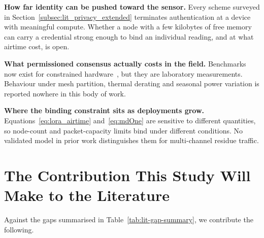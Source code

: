 \documentclass[12pt,a4paper,oneside]{book}
\begin{document}
\textbf{How far identity can be pushed toward the sensor.} Every scheme
surveyed in Section~\ref{subsec:lit_privacy_extended} terminates authentication
at a device with meaningful compute. Whether a node with a few kilobytes of
free memory can carry a credential strong enough to bind an individual reading,
and at what airtime cost, is open.

\textbf{What permissioned consensus actually costs in the
field.} Benchmarks now exist for constrained
hardware~\cite{zulkarnain2025performancebenchmarking, pebriyanti2025evaluationscalability}, but they are laboratory measurements.
Behaviour under mesh partition, thermal derating and seasonal power variation
is reported nowhere in this body of work.

\textbf{Where the binding constraint sits as deployments grow.}
Equations~\ref{eq:lora_airtime} and~\ref{eq:mdOne} are sensitive to
different quantities, so node-count and packet-capacity limits bind under
different conditions. No validated model in prior work distinguishes
them for multi-channel residue traffic.

\section{The Contribution This Study Will Make to the Literature}
\label{sec:lit_contribution}

Against the gaps summarised in Table~\ref{tab:lit-gap-summary}, we
contribute the following.
\end{document}
